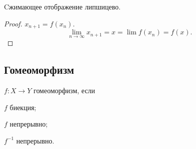 \begin{corollary}
    Cжимающее отображение липшицево.
\end{corollary}
\begin{proof}
    $x_{n+1} = f(x_n)$.
    \[\lim_{n\to\infty} x_{n+1} = x = \lim f(x_n) = f(x).\]
\end{proof}

\subsection{Гомеоморфизм}

\begin{definition}[Гомеоморфизм]
    $f\colon X\to Y$ гомеоморфизм, если 
    \begin{conditions}
        \item $f$ биекция;
        \item $f$ непрерывно;
        \item $f^{-1}$ непрерывно.
    \end{conditions}
\end{definition}